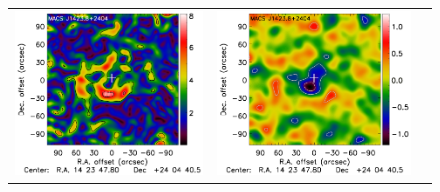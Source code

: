 \documentclass[traditabstract]{aa}
\begin{document}
\begin{figure}[p]
{\begin{tabular}{lll}
\includegraphics[trim=2.3cm 2.2cm 0cm 0cm, clip=true, scale=1]{Figure/Grad_MACSJ1424_15_15_45.pdf} & 
\includegraphics[trim=2.3cm 2.2cm 0cm 0cm, clip=true, scale=1]{Figure/DoG_MACSJ1424_15_15_45.pdf} \\

\end{tabular}}
\end{figure}
\end{document}
